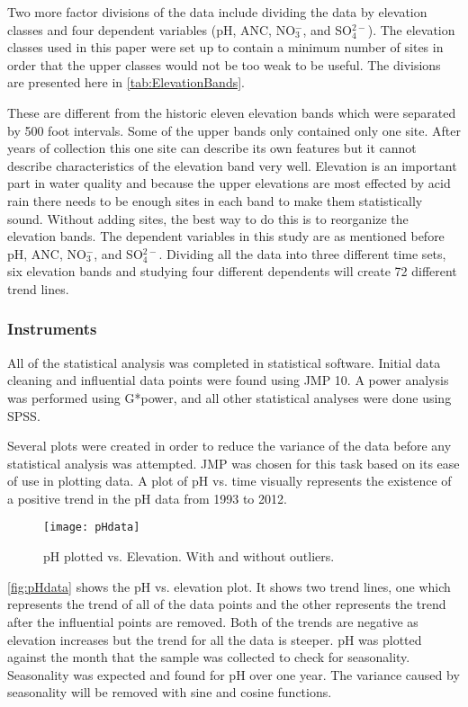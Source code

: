 Two more factor divisions of the data include dividing the data by elevation classes and four dependent variables (pH, ANC, NO$_3^-$, and SO$_4^{2-}$). The elevation classes used in this paper were set up to contain a minimum number of sites in order that the upper classes would not be too weak to be useful. The divisions are presented here in \autoref{tab:ElevationBands}.

These are different from the historic eleven elevation bands which were separated by 500 foot intervals. Some of the upper bands only contained only one site. After years of collection this one site can describe its own features but it cannot describe characteristics of the elevation band very well. Elevation is an important part in water quality and because the upper elevations are most effected by acid rain there needs to be enough sites in each band to make them statistically sound. Without adding sites, the best way to do this is to reorganize the elevation bands. The dependent variables in this study are as mentioned before pH, ANC, NO$_3^-$, and SO$_4^{2-}$. %
Dividing all the data into three different time sets, six elevation bands and studying four different dependents will create 72 different trend lines.

\subsubsection{Instruments}

All of the statistical analysis was completed in statistical software. Initial data cleaning and influential data points were found using JMP 10. A power analysis was performed using G*power, and all other statistical analyses were done using SPSS.

Several plots were created in order to reduce the variance of the data before any statistical analysis was attempted. JMP was chosen for this task based on its ease of use in plotting data. A plot of pH vs. time visually represents the existence of a positive trend in the pH data from 1993 to 2012.
\begin{figure}[h!]
\centering
  \texttt{[image: pHdata]}\\
  \caption{pH plotted vs. Elevation.  With and without outliers.}\label{fig:pHdata}
\end{figure}
\autoref{fig:pHdata} shows the pH vs. elevation plot. It shows two trend lines, one which represents the trend of all of the data points and the other represents the trend after the influential points are removed. Both of the trends are negative as elevation increases but the trend for all the data is steeper. pH was plotted against the month that the sample was collected to check for seasonality. Seasonality was expected and found for pH over one year. The variance caused by seasonality will be removed with sine and cosine functions.

